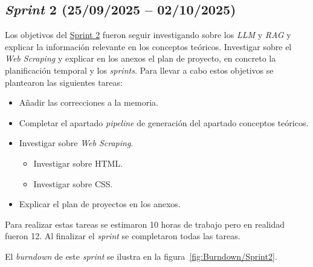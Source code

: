 \subsection{\textit{Sprint} 2 (25/09/2025 -- 02/10/2025)}
Los objetivos del \href{https://github.com/lbr1014/TFG_RAG/milestone/2?closed=1}{Sprint 2} fueron seguir investigando sobre los \textit{LLM} y \textit{RAG} y explicar la información relevante en los conceptos teóricos. Investigar sobre el \textit{Web Scraping} y explicar en los anexos el plan de proyecto, en concreto la planificación temporal y los \textit{sprints}.
Para llevar a cabo estos objetivos se plantearon las siguientes tareas:
\begin{itemize}
\tightlist
	\item Añadir las correcciones a la memoria.
	\item Completar el apartado \textit{pipeline} de generación del apartado conceptos teóricos.
	\item Investigar sobre \textit{Web Scraping}.
	\begin{itemize}
	\tightlist
		\item Investigar sobre HTML.
		\item Investigar sobre CSS.
	\end{itemize}
	\item Explicar el plan de proyectos en los anexos.
\end{itemize}

Para realizar estas tareas se estimaron 10 horas de trabajo pero en realidad fueron 12. Al finalizar el \textit{sprint} se completaron todas las tareas.

El \textit{burndown} de este \textit{sprint} se ilustra en la figura~\ref{fig:Burndown/Sprint2}.

